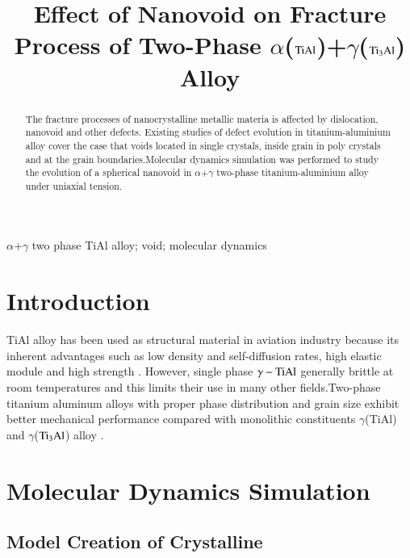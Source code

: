 \documentclass[final,5p,times,onecolumn]{elsarticle}
\begin{document}
\begin{frontmatter}
\title{Effect of Nanovoid on Fracture Process of Two-Phase $\alpha$($\rm TiAl$)+$\gamma$($\rm Ti_3Al$) Alloy}

\address[mymainaddress]{School of Mechanical and Electronical Engineering, Lanzhou University of Technology. Lanzhou 730050, China}
\begin{abstract}
 The fracture processes of nanocrystalline metallic materia is affected by dislocation, nanovoid and other defects. Existing studies of defect evolution in titanium-aluminium alloy cover the case that voids located in single crystals, inside grain in poly crystals and at the grain boundaries.Molecular dynamics simulation was performed to study the evolution of a spherical nanovoid in $\alpha$+$\gamma$ two-phase titanium-aluminium alloy under uniaxial tension.
\end{abstract}
\begin{keyword}
$\alpha$+$\gamma$ two phase TiAl alloy; void; molecular dynamics
\end{keyword}
\end{frontmatter}
\linenumbers

\section{Introduction}
TiAl alloy has been used as structural material in aviation industry because its inherent advantages such as low density and self-diffusion rates, high elastic module and high strength \cite{Xiong2015}. However, single phase $\gamma-\rm TiAl$ generally brittle at room temperatures and this limits their use in many other fields.Two-phase titanium aluminum alloys with proper phase distribution and grain size exhibit better mechanical performance compared with monolithic constituents $\gamma$(TiAl) and $\gamma$($\rm Ti_3Al$) alloy \cite{intro-structure}.

\section{Molecular Dynamics Simulation }

\subsection{Model Creation of Crystalline}
\end{document}
